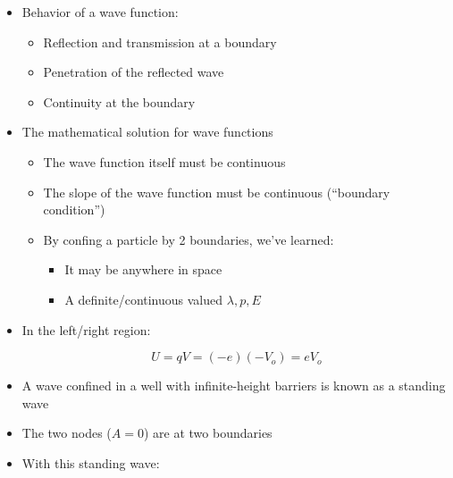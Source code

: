 \begin{itemize}
\begin{itemize}
    \end{itemize}

  \item Behavior of a wave function:

    \begin{itemize}

      \item Reflection and transmission at a boundary

      \item Penetration of the reflected wave

      \item Continuity at the boundary

    \end{itemize}

  \item The mathematical solution for wave functions

    \begin{itemize}

      \item The wave function itself must be continuous

      \item The slope of the wave function must be continuous (``boundary condition'')

      \item By confing a particle by 2 boundaries, we've learned:

        \begin{itemize}

          \item It may be anywhere in space

          \item A definite/continuous valued $\lambda,p,E$

        \end{itemize}

    \end{itemize}

  \item In the left/right region:

    $$U=qV=(-e)(-V_o)=eV_o$$

  \item A wave confined in a well with infinite-height barriers is known as a standing wave

  \item The two nodes ($A=0$) are at two boundaries

  \item With this standing wave:


\end{itemize}
